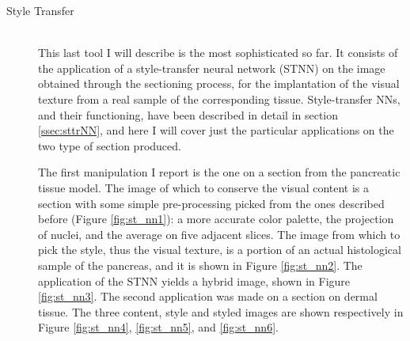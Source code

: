 \documentclass[12pt,a4paper]{report}
\begin{document}
\begin{description}
        \item [Style Transfer] \hfill \\
        This last tool I will describe is the most sophisticated so far. It consists of the application of a style-transfer neural network (STNN) on the image obtained through the sectioning process, for the implantation of the visual texture from a real sample of the corresponding tissue. Style-transfer NNs, and their functioning, have been described in detail in section \ref{ssec:sttrNN}, and here I will cover just the particular applications on the two type of section produced.

        The first manipulation I report is the one on a section from the pancreatic tissue model. The image of which to conserve the visual content is a section with some simple pre-processing picked from the ones described before (Figure \ref{fig:st_nn1}): a more accurate color palette, the projection of nuclei, and the average on five adjacent slices. The image from which to pick the style, thus the visual texture, is a portion of an actual histological sample of the pancreas, and it is shown in Figure \ref{fig:st_nn2}. The application of the STNN yields a hybrid image, shown in Figure \ref{fig:st_nn3}. The second application was made on a section on dermal tissue. The three content, style and styled images are shown respectively in Figure \ref{fig:st_nn4}, \ref{fig:st_nn5}, and \ref{fig:st_nn6}.


\end{description}
\end{document}
